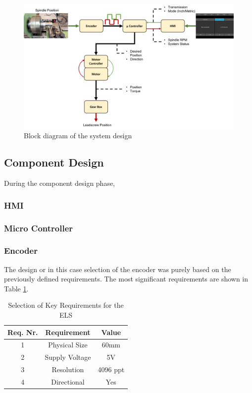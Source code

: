 \begin{figure}
    \begin{center}
    \includegraphics[width=12cm]{Pictures/SystemDesign.png}
    \caption[Block diagram of the system design]{Block diagram of the system design}
    \label{System design}
    \end{center}
\end{figure}


\subsection{Component Design}
During the component design phase, 
\subsubsection{HMI}
\subsubsection{Micro Controller}
\subsubsection{Encoder}
The design or in this case selection of the encoder was purely based on the previously defined requirements. The most significant requirements are shown in Table \ref{Tab Encoder Key Requirements}.

\begin{table}
    \centering
     \begin{tabular}{||c|c|c||} 
        \hline
        Req. Nr. & Requirement & Value\\ [0.5ex] 
        \hline\hline
        1 & Physical Size       & 60mm		\\ 
        2 & Supply Voltage      & 5V        \\
        3 & Resolution          & 4096 ppt  \\
        4 & Directional         & Yes       \\[1ex] 
        \hline
     \end{tabular}
     \caption{Selection of Key Requirements for the ELS}
     \label{Tab Encoder Key Requirements}
\end{table}

